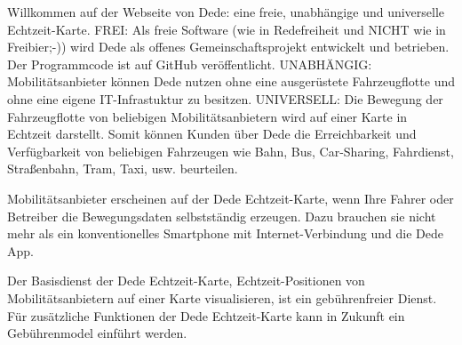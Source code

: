 
Willkommen auf der Webseite von Dede: eine freie, unabhängige und universelle Echtzeit-Karte. FREI: Als freie Software (wie in Redefreiheit und NICHT wie in Freibier;-)) wird Dede als offenes Gemeinschaftsprojekt entwickelt und betrieben. Der Programmcode ist auf GitHub veröffentlicht. UNABHÄNGIG: Mobilitätsanbieter können Dede nutzen ohne eine ausgerüstete Fahrzeugflotte und ohne eine eigene IT-Infrastuktur zu besitzen. UNIVERSELL: Die Bewegung der Fahrzeugflotte von beliebigen Mobilitätsanbietern wird auf einer Karte in Echtzeit darstellt. Somit können Kunden über Dede die Erreichbarkeit und Verfügbarkeit von beliebigen Fahrzeugen wie Bahn, Bus, Car-Sharing, Fahrdienst, Straßenbahn, Tram, Taxi, usw. beurteilen.

Mobilitätsanbieter erscheinen auf der Dede Echtzeit-Karte, wenn Ihre Fahrer oder Betreiber die Bewegungsdaten selbstständig erzeugen. Dazu brauchen sie nicht mehr als ein konventionelles Smartphone mit Internet-Verbindung und die Dede App.

Der Basisdienst der Dede Echtzeit-Karte, Echtzeit-Positionen von Mobilitätsanbietern auf einer Karte visualisieren, ist ein gebührenfreier Dienst. Für zusätzliche Funktionen der Dede Echtzeit-Karte kann in Zukunft ein Gebührenmodel einführt werden.


